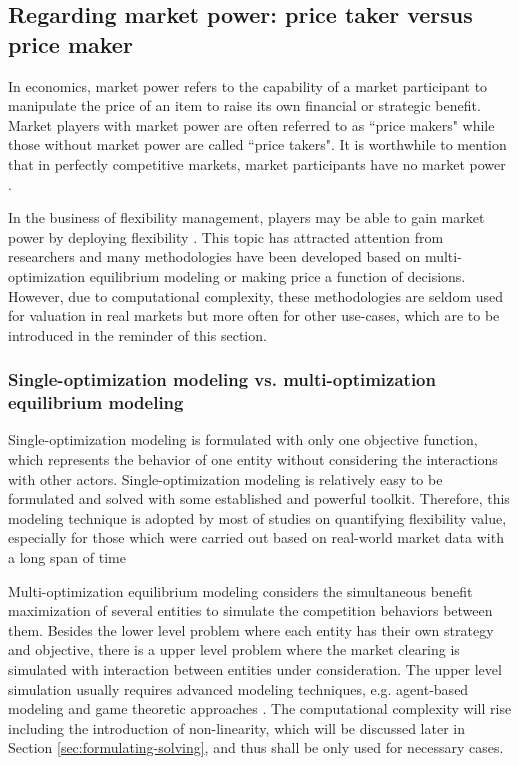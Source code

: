 \subsection{Regarding market power: price taker versus price maker}
In economics, market power refers to the capability of a market participant to manipulate the price of an item to raise its own financial or strategic benefit. Market players with market power are often referred to as ``price makers" while those without market power are called ``price takers". It is worthwhile to mention that in perfectly competitive markets, market participants have no market power \cite{Mankiw2011}. 

In the business of flexibility management, players may be able to gain market power by deploying flexibility \cite{Zucker2013,Schill2011,He2012}.
This topic has attracted attention from researchers and many methodologies have been developed based on multi-optimization equilibrium modeling or making price a function of decisions. However, due to computational complexity, these methodologies are seldom used for valuation in real markets but more often for other use-cases, which are to be introduced in the reminder of this section.

\subsubsection{Single-optimization modeling vs. multi-optimization equilibrium modeling}
Single-optimization modeling is formulated with only one objective function, which represents the behavior of one entity without considering the  interactions with other actors. Single-optimization modeling is relatively easy to be formulated and solved with some established and powerful toolkit. Therefore, this modeling technique is adopted by most of studies on quantifying flexibility value, especially for those which were carried out based on real-world market data with a long span of time \cite{Walawalkar2007,Sioshansi2009,Byrne2012,Bradbury2014,McConnell2015,Berrada2016,Salles2017}

Multi-optimization equilibrium modeling considers the simultaneous benefit maximization of several entities to simulate the competition behaviors between them. Besides the lower level problem where each entity has their own strategy and objective, there is a upper level problem where the market clearing is simulated with interaction between entities under consideration. The upper level simulation usually requires advanced modeling techniques, e.g. agent-based modeling \cite{Yousefi2011,Dallinger2012,Zheng2014} and game theoretic approaches \cite{Schill2011,Gkatzikis2013,Lin2014,Kardakos2013}. The computational complexity will rise including the introduction of non-linearity, which will be discussed later in Section \ref{sec:formulating-solving}, and thus shall be only used for necessary cases. 

